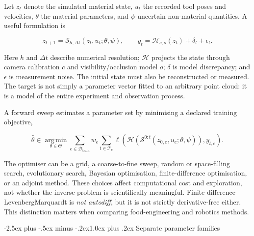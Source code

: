 \documentclass[
  11pt,
]{article}
\makeatletter
\renewcommand\subsection{\needspace{5\baselineskip}\@startsection{subsection}{2}{\z@}%
  {-2.5ex plus -.5ex minus -.2ex}{1.0ex plus .2ex}%
  {\normalfont\sffamily\large\bfseries\color{accent}}}
\makeatother
\begin{document}
Let \(z_t\) denote the simulated material state, \(u_t\) the recorded
tool poses and velocities, \(\theta\) the material parameters, and
\(\psi\) uncertain non-material quantities. A useful formulation is

\[
z_{t+1}=\mathcal S_{h,\Delta t}(z_t,u_t;\theta,\psi),
\qquad
y_t=\mathcal H_{c,o}(z_t)+\delta_t+\epsilon_t.
\]

Here \(h\) and \(\Delta t\) describe numerical resolution;
\(\mathcal H\) projects the state through camera calibration \(c\) and
visibility/occlusion model \(o\); \(\delta\) is model discrepancy; and
\(\epsilon\) is measurement noise. The initial state must also be
reconstructed or measured. The target is not simply a parameter vector
fitted to an arbitrary point cloud: it is a model of the entire
experiment and observation process.

A forward sweep estimates a parameter set by minimising a declared
training objective,

\[
\widehat\theta\in\operatorname*{arg\,min}_{\theta\in\Theta}
\sum_{e\in\mathcal D_{\mathrm{train}}}w_e
\sum_{t\in\mathcal T_e}\ell\!\left(
\mathcal H(\mathcal S^{0:t}(z_{0,e},u_e;\theta,\psi)),y_{t,e}
\right).
\]

The optimiser can be a grid, a coarse-to-fine sweep, random or
space-filling search, evolutionary search, Bayesian optimisation,
finite-difference optimisation, or an adjoint method. These choices
affect computational cost and exploration, not whether the inverse
problem is scientifically meaningful. Finite-difference
Levenberg\textendash{}\allowbreak{}Marquardt is \emph{not autodiff}, but
it is not strictly derivative-free either. This distinction matters when
comparing food-engineering and robotics methods.

\subsection{Separate parameter
families}\label{separate-parameter-families}
\end{document}
